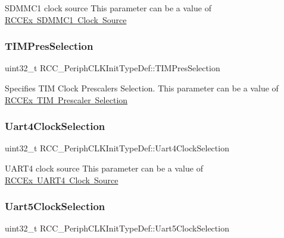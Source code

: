 S\+D\+M\+M\+C1 clock source This parameter can be a value of \mbox{\hyperlink{group___r_c_c_ex___s_d_m_m_c1___clock___source}{R\+C\+C\+Ex S\+D\+M\+M\+C1 Clock Source}} \mbox{\label{struct_r_c_c___periph_c_l_k_init_type_def_a18502c3bdf821d335ea8687affb4c275}} 
\subsubsection{\texorpdfstring{TIMPresSelection}{TIMPresSelection}}
{\footnotesize\ttfamily uint32\+\_\+t R\+C\+C\+\_\+\+Periph\+C\+L\+K\+Init\+Type\+Def\+::\+T\+I\+M\+Pres\+Selection}

Specifies T\+IM Clock Prescalers Selection. This parameter can be a value of \mbox{\hyperlink{group___r_c_c_ex___t_i_m___prescaler___selection}{R\+C\+C\+Ex T\+IM Prescaler Selection}} \mbox{\label{struct_r_c_c___periph_c_l_k_init_type_def_aabd6a82d7fb65c1223519d96b03aa747}} 
\subsubsection{\texorpdfstring{Uart4ClockSelection}{Uart4ClockSelection}}
{\footnotesize\ttfamily uint32\+\_\+t R\+C\+C\+\_\+\+Periph\+C\+L\+K\+Init\+Type\+Def\+::\+Uart4\+Clock\+Selection}

U\+A\+R\+T4 clock source This parameter can be a value of \mbox{\hyperlink{group___r_c_c_ex___u_a_r_t4___clock___source}{R\+C\+C\+Ex U\+A\+R\+T4 Clock Source}} \mbox{\label{struct_r_c_c___periph_c_l_k_init_type_def_a9f564245930ae4f09c1b0e4dd29e4bce}} 
\subsubsection{\texorpdfstring{Uart5ClockSelection}{Uart5ClockSelection}}
{\footnotesize\ttfamily uint32\+\_\+t R\+C\+C\+\_\+\+Periph\+C\+L\+K\+Init\+Type\+Def\+::\+Uart5\+Clock\+Selection}

